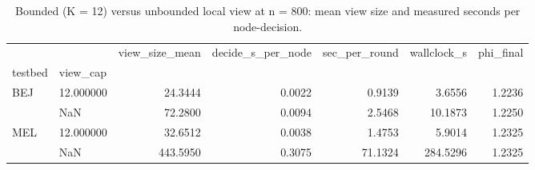 \begin{table}
\caption{Bounded (K = 12) versus unbounded local view at n = 800: mean view size and measured seconds per node-decision.}
\label{tab:table10_viewbound}
\begin{tabular}{llrrrrr}
\toprule
 &  & view\_size\_mean & decide\_s\_per\_node & sec\_per\_round & wallclock\_s & phi\_final \\
testbed & view_cap &  &  &  &  &  \\
\midrule
\multirow[t]{2}{*}{BEJ} & 12.000000 & 24.3444 & 0.0022 & 0.9139 & 3.6556 & 1.2236 \\
 & NaN & 72.2800 & 0.0094 & 2.5468 & 10.1873 & 1.2250 \\
\cline{1-7}
\multirow[t]{2}{*}{MEL} & 12.000000 & 32.6512 & 0.0038 & 1.4753 & 5.9014 & 1.2325 \\
 & NaN & 443.5950 & 0.3075 & 71.1324 & 284.5296 & 1.2325 \\
\cline{1-7}
\bottomrule
\end{tabular}
\end{table}
